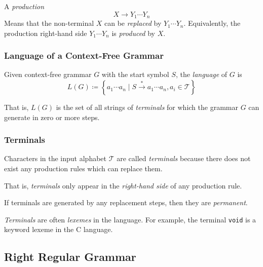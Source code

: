 \begin{example}
    A \textit{production}
    \begin{equation*}
        X \to Y_1 \cdots Y_n
    \end{equation*}
    Means that the non-terminal $X$ can be \textit{replaced} by $Y_1 \cdots Y_n$. Equivalently, the production right-hand side $Y_1 \cdots Y_n$ is \textit{produced} by $X$.
\end{example}

\subsubsection{Language of a Context-Free Grammar}

\begin{definition}
    Given context-free grammar $G$ with the start symbol $S$, the \textit{language} of $G$ is
    \begin{equation}
        L(G) \coloneqq \left\lbrace a_1 \cdots a_n \mid S \xrightarrow{\ast} a_1 \cdots a_n, a_i \in \mathcal{T} \right\rbrace
    \end{equation}
    
    That is, $L(G)$ is the set of all strings of \textit{terminals} for which the grammar $G$ can generate in zero or more steps.
\end{definition}

\subsubsection{Terminals}

\begin{definition}[Terminals]
    Characters in the input alphabet $\mathcal{T}$ are called \textit{terminals} because there does not exist any production rules which can replace them.
    
    That is, \textit{terminals} only appear in the \textit{right-hand side} of any production rule.
\end{definition}

\begin{remark}
    If terminals are generated by any replacement steps, then they are \textit{permanent}.
    
    \textit{Terminals} are often \textit{lexemes} in the language. For example, the terminal \texttt{void} is a keyword lexeme in the C language.
\end{remark}

\subsection{Right Regular Grammar}


